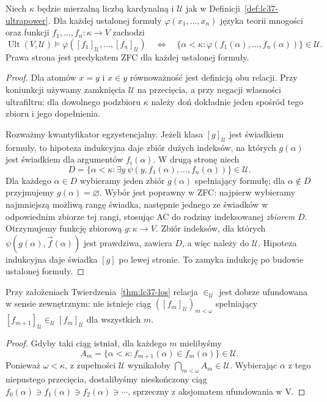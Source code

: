 \begin{twierdzenie}
\label{thm:lc37-los}
Niech $\kappa$ będzie mierzalną liczbą kardynalną i
$\mathcal U$ jak w
Definicji~\ref{def:lc37-ultrapower}.
Dla każdej ustalonej formuły
$\varphi(x_1,\ldots,x_n)$ języka
teorii mnogości oraz funkcji
$f_1,\ldots,f_n:\kappa\to V$ zachodzi
\[
 \operatorname{Ult}(V,\mathcal U)
 \models\varphi([f_1]_{\mathcal U},
                \ldots,[f_n]_{\mathcal U})
 \quad\Longleftrightarrow\quad
 \{\alpha<\kappa:
 \varphi(f_1(\alpha),\ldots,f_n(\alpha))\}
 \in\mathcal U.
\]
Prawa strona jest predykatem ZFC dla
każdej ustalonej formuły.
\end{twierdzenie}
\begin{proof}
Dla atomów $x=y$ i $x\in y$
równoważność jest definicją obu
relacji. Przy koniunkcji używamy
zamknięcia $\mathcal U$ na przecięcia,
a przy negacji własności ultrafiltru:
dla dowolnego podzbioru $\kappa$
należy doń dokładnie jeden spośród
tego zbioru i jego dopełnienia.

Rozważmy kwantyfikator egzystencjalny.
Jeżeli klasa $[g]_{\mathcal U}$
jest świadkiem formuły, to hipoteza
indukcyjna daje zbiór dużych indeksów,
na których $g(\alpha)$ jest świadkiem
dla argumentów $f_i(\alpha)$.
W drugą stronę niech
\[
 D=\{\alpha<\kappa:
  \exists y\ \psi(y,f_1(\alpha),\ldots,
                         f_n(\alpha))\}\in\mathcal U.
\]
Dla każdego $\alpha\in D$ wybieramy
jeden zbiór $g(\alpha)$ spełniający
formułę; dla $\alpha\notin D$
przyjmujemy $g(\alpha)=\varnothing$.
Wybór jest poprawny w ZFC: najpierw
wybieramy najmniejszą możliwą rangę
świadka, następnie jednego ze świadków
w odpowiednim zbiorze tej rangi,
stosując AC do rodziny indeksowanej
\emph{zbiorem} $D$.
Otrzymujemy funkcję zbiorową
$g:\kappa\to V$. Zbiór indeksów,
dla których $\psi(g(\alpha),\vec f(\alpha))$
jest prawdziwa, zawiera $D$,
a więc należy do $\mathcal U$.
Hipoteza indukcyjna daje świadka $[g]$
po lewej stronie. To zamyka indukcję
po budowie ustalonej formuły.
\end{proof}

\begin{lemat}
\label{lem:lc37-wellfounded}
Przy założeniach
Twierdzenia~\ref{thm:lc37-los}
relacja $\in_{\mathcal U}$ jest
dobrze ufundowana w sensie
zewnętrznym: nie istnieje ciąg
$([f_m]_{\mathcal U})_{m<\omega}$
spełniający
$[f_{m+1}]_{\mathcal U}\in_{\mathcal U}
 [f_m]_{\mathcal U}$ dla wszystkich $m$.
\end{lemat}
\begin{proof}
Gdyby taki ciąg istniał,
dla każdego $m$ mielibyśmy
\[
 A_m=\{\alpha<\kappa:
      f_{m+1}(\alpha)\in f_m(\alpha)\}
      \in\mathcal U.
\]
Ponieważ $\omega<\kappa$, z zupełności
$\mathcal U$ wynikałoby
$\bigcap_{m<\omega}A_m\in\mathcal U$.
Wybierając $\alpha$ z tego
niepustego przecięcia,
dostalibyśmy nieskończony ciąg
$f_0(\alpha)\ni f_1(\alpha)\ni
f_2(\alpha)\ni\cdots$, sprzeczny
z aksjomatem ufundowania w V.
\end{proof}

